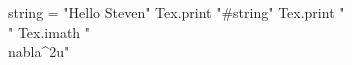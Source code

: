 \documentclass{article}
\begin{document}
\begin{rbtex}
string = "Hello Steven"
Tex.print "#{string}"
Tex.print "\\[\\frac{\\nabla F}{9}\\]"
Tex.imath "{\\nabla^{2}u}"
\end{rbtex}
\end{document}
